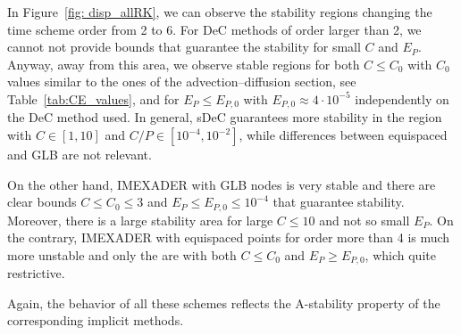 In Figure~\ref{fig: disp_allRK}, we can observe the stability regions changing the time scheme order from 2 to 6. 
For DeC methods of order larger than 2, we cannot  not provide bounds that guarantee the stability for small $C$ and $E_P$.
Anyway, away from this area, we observe stable regions for both $C\leq C_0$ with $C_0$ values similar to the ones of the advection--diffusion section, see Table~\ref{tab:CE_values}, and for $E_P\leq E_{P,0}$ with $E_{P,0}\approx 4\cdot 10^{-5}$ independently on the DeC method used.
In general, sDeC guarantees more stability in the region with $C\in [1,10]$ and $C/P\in [10^{-4},10^{-2}]$, while differences between equispaced and GLB are not relevant.

On the other hand, IMEXADER with GLB nodes is very stable and there are clear bounds $C\leq C_0\leq 3$ and $E_P\leq E_{P,0}\leq 10^{-4}$ that guarantee stability. Moreover, there is a large stability area for large $C\leq 10$ and not so small $E_P$.
On the contrary, IMEXADER with equispaced points for order more than 4 is much more unstable and only the are with both $C\leq C_0$ and $E_P \geq E_{P,0}$, which quite restrictive.

Again, the behavior of all these schemes reflects the A-stability property of the corresponding implicit methods.



